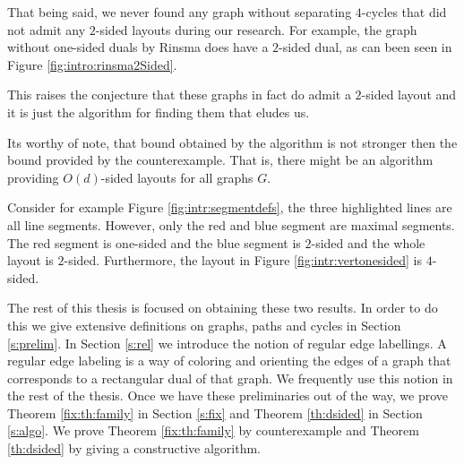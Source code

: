   That being said, we never found any graph without separating $4$-cycles that did not admit any $2$-sided layouts during our research. For example, the graph without one-sided duals by Rinsma does have a $2$-sided dual, as can been seen in Figure \ref{fig:intro:rinsma2Sided}.

  This raises the conjecture that these graphs in fact do admit a $2$-sided layout and it is just the algorithm for finding them that eludes us.

  Its worthy of note, that bound obtained by the algorithm is not stronger then the bound provided by the counterexample. That is, there might be an algorithm providing $O(d)$-sided layouts for all graphs $G$.

  Consider for example Figure \ref{fig:intr:segmentdefs}, the three highlighted lines are all line segments. However, only the red and blue segment are maximal segments. The red segment is one-sided and the blue segment is $2$-sided and the whole layout is $2$-sided. Furthermore, the layout in Figure \ref{fig:intr:vertonesided} is $4$-sided.

  The rest of this thesis is focused on obtaining these two results.
  In order to do this we give extensive definitions on graphs, paths and cycles in Section \ref{s:prelim}. In Section \ref{s:rel} we introduce the notion of regular edge labellings.  A regular edge labeling is a way of coloring and orienting the edges of a graph that corresponds to a rectangular dual of that graph.
  We frequently use this notion in the rest of the thesis.
  Once we have these preliminaries out of the way, we prove Theorem \ref{fix:th:family} in Section \ref{s:fix} and Theorem \ref{th:dsided} in Section \ref{s:algo}. We prove Theorem \ref{fix:th:family} by counterexample and Theorem \ref{th:dsided} by giving a constructive algorithm.


